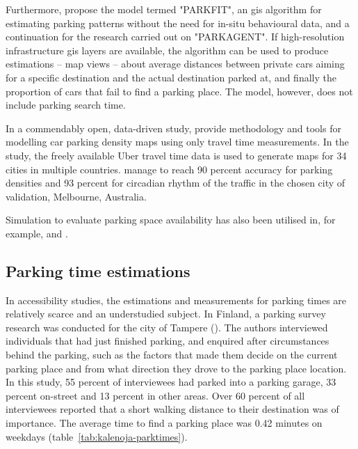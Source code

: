 Furthermore,  propose the model termed "PARKFIT", an \acrshort{gis} algorithm for estimating parking patterns without the need for in-situ behavioural data, and a continuation for the research carried out on "PARKAGENT". If high-resolution infrastructure \acrshort{gis} layers are available, the algorithm can be used to produce estimations -- map views -- about average distances between private cars aiming for a specific destination and the actual destination parked at, and finally the proportion of cars that fail to find a parking place. The model, however, does not include parking search time.

In a commendably open, data-driven study,  provide methodology and tools for modelling car parking density maps using only travel time measurements. In the study, the freely available Uber travel time data is used to generate maps for 34 cities in multiple countries. \citeauthor{Aryandoust2019} manage to reach 90 percent accuracy for parking densities and 93 percent for circadian rhythm of the traffic in the chosen city of validation, Melbourne, Australia.

Simulation to evaluate parking space availability has also been utilised in, for example,  and .

\subsection{Parking time estimations}
\justify

In accessibility studies, the estimations and measurements for parking times are relatively scarce and an understudied subject. In Finland, a parking survey research was conducted for the city of Tampere (\cite{Kalenoja2003}). The authors interviewed individuals that had just finished parking, and enquired after circumstances behind the parking, such as the factors that made them decide on the current parking place and from what direction they drove to the parking place location. In this study, 55 percent of interviewees had parked into a parking garage, 33 percent on-street and 13 percent in other areas. Over 60 percent of all interviewees reported that a short walking distance to their destination was of importance. The average time to find a parking place was 0.42 minutes on weekdays (table~\ref{tab:kalenoja-parktimes}).

